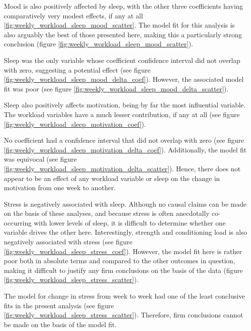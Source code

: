 \documentclass{article}
\begin{document}

			Mood is also positively affected by sleep, with the other three coefficients
			having comparatively very modest effects, if any at all
			\ref{fig:weekly_workload_sleep_mood_scatter}. The model fit for this
			analysis is also arguably the best of those presented here, making this
			a particularly strong conclusion
			(figure \ref{fig:weekly_workload_sleep_mood_scatter}).


			Sleep was the only variable whose coefficient confidence interval did
			not overlap with zero, suggesting a potential effect
			(see figure \ref{fig:weekly_workload_sleep_mood_delta_coef}).
			However, the associated model fit was poor (see figure
			\ref{fig:weekly_workload_sleep_mood_delta_scatter}).


			Sleep also positively affects motivation, being by far the most influential
			variable. The workload variables have a much lesser contribution, if any
			at all (see figure \ref{fig:weekly_workload_sleep_motivation_coef}).


			No coefficient had a confidence interval that did not overlap with zero
			(see figure
			\ref{fig:weekly_workload_sleep_motivation_delta_coef}). Additionally, the
			model fit was equivocal (see figure
			\ref{fig:weekly_workload_sleep_motivation_delta_scatter}).
			Hence, there does not appear to be an effect of any workload variable
			or sleep on the change in motivation from one week to another.


			Stress is negatively associated with sleep. Although no causal claims can
			be made on the basis of these analyses, and because stress is often
			anecdotally co-occurring with lower levels of sleep, it is difficult
			to determine whether one variable drives the other here. Interestingly,
			strength and conditioning load is also negatively associated with stress
			(see figure
			\ref{fig:weekly_workload_sleep_stress_coef}). However, the model fit here
			is rather poor both in absolute terms and compared to the other outcomes
			in question, making it difficult to justify any firm conclusions on the
			basis of the data (figure \ref{fig:weekly_workload_sleep_stress_scatter}).


			The model for change in stress from week to week had one of the least
			conclusive fits in the present analysis (see figure
			\ref{fig:weekly_workload_sleep_stress_scatter}). Therefore, firm
			conclusions cannot be made on the basis of the model fit.
\end{document}
